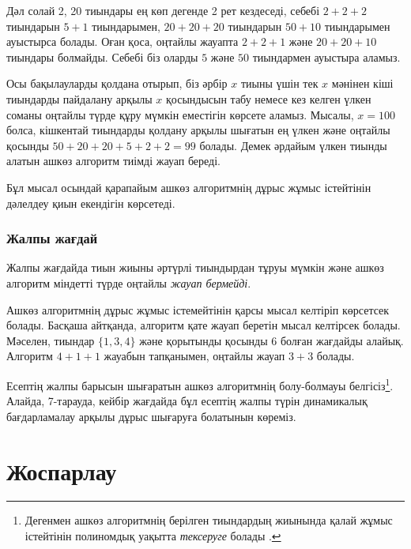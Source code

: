 Дәл солай 2, 20 тиындары ең көп дегенде 2 рет кездеседі,
себебі $2+2+2$ тиындарын $5+1$ тиындарымен, $20+20+20$ 
тиындарын $50+10$ тиындарымен ауыстырса болады. Оған қоса,
оңтайлы жауапта $2+2+1$ және $20+20+10$ тиындары болмайды.
Себебі біз оларды $5$ және $50$ тиындармен ауыстыра аламыз.

Осы бақылауларды қолдана отырып, біз
әрбір $x$ тиыны үшін тек $x$ мәнінен
кіші тиындарды пайдалану арқылы $x$ қосындысын табу
немесе кез келген үлкен соманы оңтайлы түрде құру 
мүмкін еместігін көрсете аламыз. Мысалы, $x=100$
болса, кішкентай тиындарды қолдану арқылы шығатын ең үлкен 
және оңтайлы қосынды $50+20+20+5+2+2=99$ болады. 
Демек әрдайым үлкен тиынды алатын ашкөз алгоритм тиімді
жауап береді. 

Бұл мысал осындай қарапайым ашкөз алгоритмнің 
дұрыс жұмыс істейтінін дәлелдеу қиын екендігін көрсетеді. 

\subsubsection{Жалпы жағдай}

Жалпы жағдайда тиын жиыны әртүрлі тиындырдан тұруы мүмкін
және ашкөз алгоритм міндетті түрде оңтайлы \emph{жауап бермейді}.

Ашкөз алгоритмнің дұрыс жұмыс істемейтінін қарсы 
мысал келтіріп көрсетсек болады. Басқаша айтқанда, алгоритм
қате жауап беретін мысал келтірсек болады.
Мәселен, тиындар $\{1,3,4\}$
және қорытынды қосынды 6 болған жағдайды алайық.
Алгоритм $4+1+1$ жауабын тапқанымен, оңтайлы жауап
$3+3$ болады.

Есептің жалпы барысын шығаратын ашкөз алгоритмнің
болу-болмауы белгісіз\footnote{
Дегенмен ашкөз алгоритмнің берілген тиындардың жиынында 
қалай жұмыс істейтінін полиномдық уақытта \emph{тексеруге} болады
\cite{pea05}.}. Алайда, 7-тарауда, 
кейбір жағдайда бұл есептің жалпы түрін динамикалық бағдарламалау
арқылы дұрыс шығаруға болатынын көреміз.

\section{Жоспарлау}

